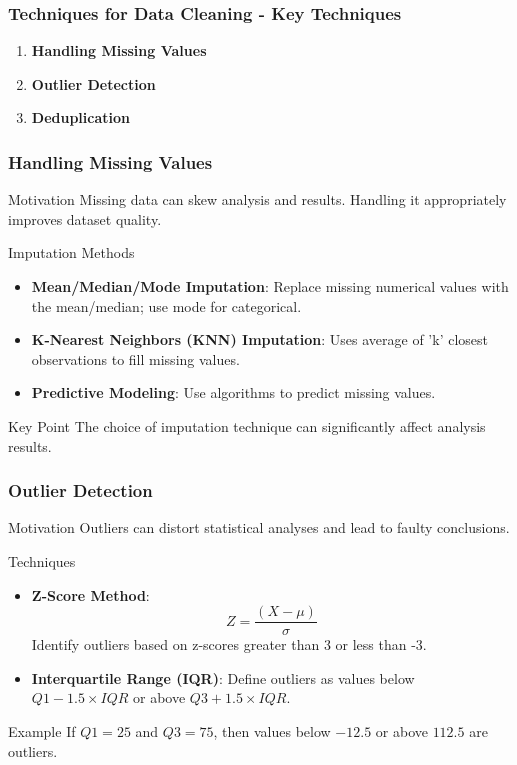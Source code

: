 \documentclass[aspectratio=169]{beamer}
\begin{document}
\begin{frame}[fragile]
    \frametitle{Techniques for Data Cleaning - Key Techniques}
    \begin{enumerate}
        \item \textbf{Handling Missing Values}
        \item \textbf{Outlier Detection}
        \item \textbf{Deduplication}
    \end{enumerate}
\end{frame}

\begin{frame}[fragile]
    \frametitle{Handling Missing Values}
    \begin{block}{Motivation}
        Missing data can skew analysis and results. Handling it appropriately improves dataset quality.
    \end{block}
    \begin{block}{Imputation Methods}
        \begin{itemize}
            \item \textbf{Mean/Median/Mode Imputation}: Replace missing numerical values with the mean/median; use mode for categorical.
            \item \textbf{K-Nearest Neighbors (KNN) Imputation}: Uses average of 'k' closest observations to fill missing values.
            \item \textbf{Predictive Modeling}: Use algorithms to predict missing values.
        \end{itemize}
    \end{block}
    \begin{block}{Key Point}
        The choice of imputation technique can significantly affect analysis results.
    \end{block}
\end{frame}

\begin{frame}[fragile]
    \frametitle{Outlier Detection}
    \begin{block}{Motivation}
        Outliers can distort statistical analyses and lead to faulty conclusions.
    \end{block}
    \begin{block}{Techniques}
        \begin{itemize}
            \item \textbf{Z-Score Method}: 
            \[
            Z = \frac{(X - \mu)}{\sigma}
            \]
            Identify outliers based on z-scores greater than 3 or less than -3.
            \item \textbf{Interquartile Range (IQR)}: 
            Define outliers as values below \( Q1 - 1.5 \times IQR \) or above \( Q3 + 1.5 \times IQR \).
        \end{itemize}
    \end{block}
    \begin{block}{Example}
        If \( Q1 = 25 \) and \( Q3 = 75 \), then values below \(-12.5\) or above \(112.5\) are outliers.
    \end{block}
\end{frame}
\end{document}
